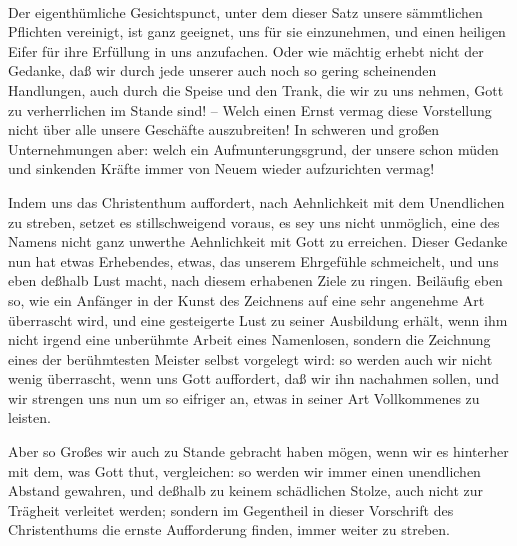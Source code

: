 \begin{aufza}
\begin{aufzb}
\end{aufzb}
\item {}~\par
Der eigenthümliche Gesichtspunct, unter dem dieser Satz unsere sämmtlichen Pflichten vereinigt, ist ganz geeignet, uns für sie einzunehmen, und einen heiligen Eifer für ihre Erfüllung in uns anzufachen. Oder wie mächtig erhebt nicht der Gedanke, daß wir durch jede unserer auch noch so gering scheinenden Handlungen, auch durch die Speise und den Trank, die wir zu uns nehmen, Gott zu verherrlichen im Stande sind! -- Welch einen Ernst vermag diese Vorstellung nicht über alle unsere Geschäfte auszubreiten! In schweren und großen Unternehmungen aber: welch ein Aufmunterungsgrund, der unsere schon müden und sinkenden Kräfte immer von Neuem wieder aufzurichten vermag!
\item {}\par
\begin{aufzb}
\item Indem uns das Christenthum auffordert, nach Aehnlichkeit mit dem Unendlichen zu streben, setzet es stillschweigend voraus, es sey uns nicht unmöglich, eine des Namens nicht ganz unwerthe Aehnlichkeit mit Gott zu erreichen. Dieser Gedanke nun hat etwas Erhebendes, etwas, das unserem Ehrgefühle schmeichelt, und uns eben deßhalb Lust macht, nach diesem erhabenen Ziele zu ringen. Beiläufig eben so, wie ein Anfänger in der Kunst des Zeichnens auf eine sehr angenehme Art überrascht wird, und eine gesteigerte Lust zu seiner Ausbildung erhält, wenn ihm nicht irgend eine unberühmte Arbeit eines Namenlosen, sondern die Zeichnung eines der berühmtesten Meister selbst vorgelegt wird: so werden auch wir nicht wenig überrascht, wenn uns Gott auffordert, daß wir ihn nachahmen sollen, und wir strengen uns nun um so eifriger an, etwas in seiner Art Vollkommenes zu leisten.
\item Aber so Großes wir auch zu Stande gebracht haben mögen, wenn wir es hinterher mit dem, was Gott thut, vergleichen: so werden wir immer einen unendlichen Abstand gewahren, und deßhalb zu keinem schädlichen Stolze, auch nicht zur Trägheit verleitet werden; sondern im Gegentheil in dieser Vorschrift des Christenthums die ernste Aufforderung finden, immer weiter zu streben.
\end{aufzb}
\item {}~\par

\end{aufza}
